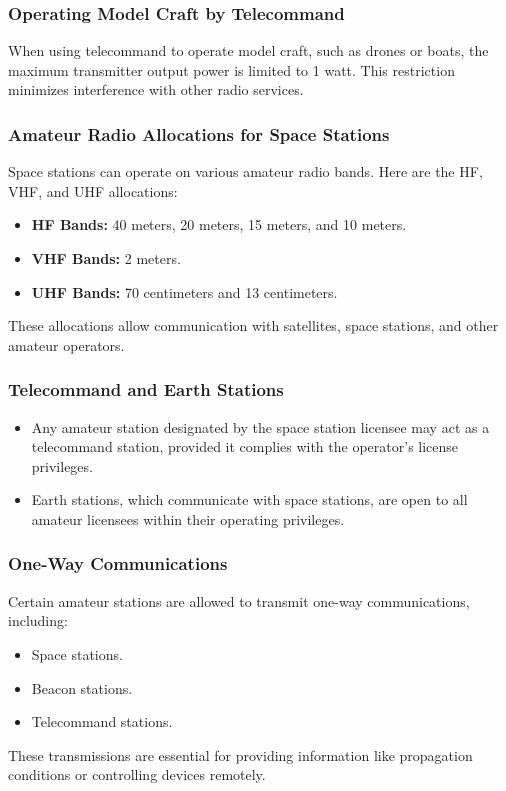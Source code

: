 \subsubsection*{Operating Model Craft by Telecommand}
When using telecommand to operate model craft, such as drones or boats, the maximum transmitter output power is limited to 1 watt. This restriction minimizes interference with other radio services.

\subsubsection*{Amateur Radio Allocations for Space Stations}
Space stations can operate on various amateur radio bands. Here are the HF, VHF, and UHF allocations:
\begin{itemize}
    \item \textbf{HF Bands:} 40 meters, 20 meters, 15 meters, and 10 meters.
    \item \textbf{VHF Bands:} 2 meters.
    \item \textbf{UHF Bands:} 70 centimeters and 13 centimeters.
\end{itemize}
These allocations allow communication with satellites, space stations, and other amateur operators.

\subsubsection*{Telecommand and Earth Stations}
\begin{itemize}
    \item Any amateur station designated by the space station licensee may act as a telecommand station, provided it complies with the operator’s license privileges.
    \item Earth stations, which communicate with space stations, are open to all amateur licensees within their operating privileges.
\end{itemize}

\subsubsection*{One-Way Communications}
Certain amateur stations are allowed to transmit one-way communications, including:
\begin{itemize}
    \item Space stations.
    \item Beacon stations.
    \item Telecommand stations.
\end{itemize}
These transmissions are essential for providing information like propagation conditions or controlling devices remotely.

